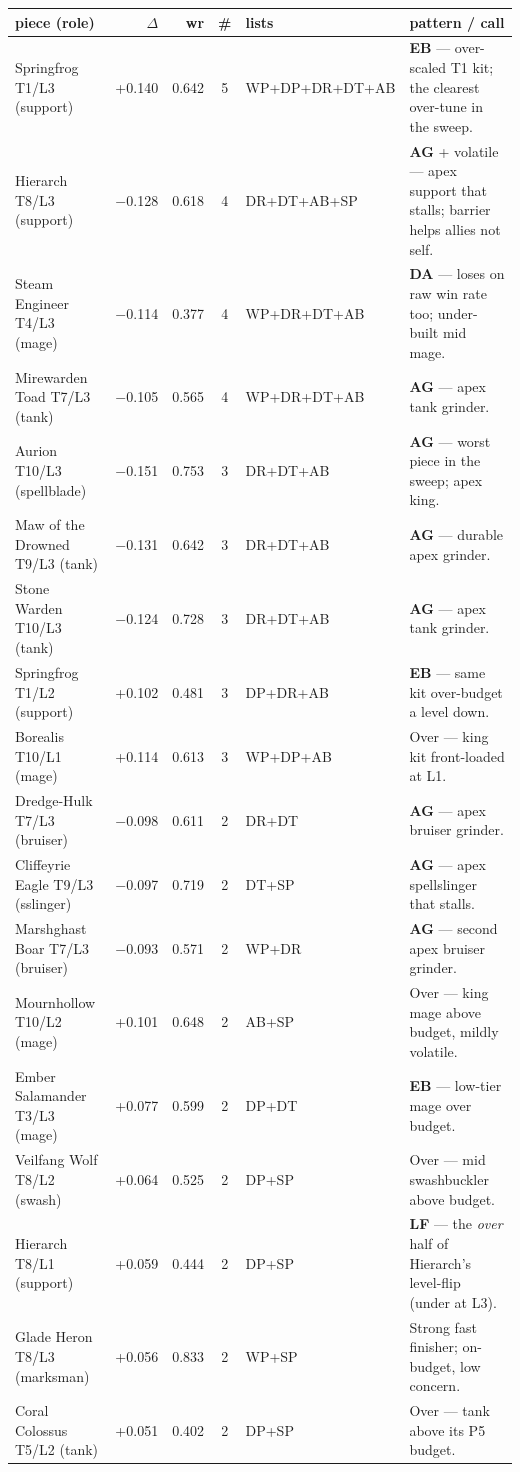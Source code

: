 \documentclass[10pt]{article}
\begin{document}
{\small
\begin{tabularx}{\linewidth}{lrrclL}
\toprule
\textbf{piece (role)} & \textbf{$\Delta$} & \textbf{wr} & \textbf{\#} & \textbf{lists} & \textbf{pattern / call} \\
\midrule
Springfrog T1/L3 (support) & +0.140 & 0.642 & 5 & WP+DP+DR+DT+AB & \textbf{EB} --- over-scaled T1 kit; the clearest over-tune in the sweep. \\
Hierarch T8/L3 (support) & $-$0.128 & 0.618 & 4 & DR+DT+AB+SP & \textbf{AG} + volatile --- apex support that stalls; barrier helps allies not self. \\
Steam Engineer T4/L3 (mage) & $-$0.114 & 0.377 & 4 & WP+DR+DT+AB & \textbf{DA} --- loses on raw win rate too; under-built mid mage. \\
Mirewarden Toad T7/L3 (tank) & $-$0.105 & 0.565 & 4 & WP+DR+DT+AB & \textbf{AG} --- apex tank grinder. \\
Aurion T10/L3 (spellblade) & $-$0.151 & 0.753 & 3 & DR+DT+AB & \textbf{AG} --- worst piece in the sweep; apex king. \\
Maw of the Drowned T9/L3 (tank) & $-$0.131 & 0.642 & 3 & DR+DT+AB & \textbf{AG} --- durable apex grinder. \\
Stone Warden T10/L3 (tank) & $-$0.124 & 0.728 & 3 & DR+DT+AB & \textbf{AG} --- apex tank grinder. \\
Springfrog T1/L2 (support) & +0.102 & 0.481 & 3 & DP+DR+AB & \textbf{EB} --- same kit over-budget a level down. \\
Borealis T10/L1 (mage) & +0.114 & 0.613 & 3 & WP+DP+AB & Over --- king kit front-loaded at L1. \\
Dredge-Hulk T7/L3 (bruiser) & $-$0.098 & 0.611 & 2 & DR+DT & \textbf{AG} --- apex bruiser grinder. \\
Cliffeyrie Eagle T9/L3 (sslinger) & $-$0.097 & 0.719 & 2 & DT+SP & \textbf{AG} --- apex spellslinger that stalls. \\
Marshghast Boar T7/L3 (bruiser) & $-$0.093 & 0.571 & 2 & WP+DR & \textbf{AG} --- second apex bruiser grinder. \\
Mournhollow T10/L2 (mage) & +0.101 & 0.648 & 2 & AB+SP & Over --- king mage above budget, mildly volatile. \\
Ember Salamander T3/L3 (mage) & +0.077 & 0.599 & 2 & DP+DT & \textbf{EB} --- low-tier mage over budget. \\
Veilfang Wolf T8/L2 (swash) & +0.064 & 0.525 & 2 & DP+SP & Over --- mid swashbuckler above budget. \\
Hierarch T8/L1 (support) & +0.059 & 0.444 & 2 & DP+SP & \textbf{LF} --- the \emph{over} half of Hierarch's level-flip (under at L3). \\
Glade Heron T8/L3 (marksman) & +0.056 & 0.833 & 2 & WP+SP & Strong fast finisher; on-budget, low concern. \\
Coral Colossus T5/L2 (tank) & +0.051 & 0.402 & 2 & DP+SP & Over --- tank above its P5 budget. \\
\bottomrule
\end{tabularx}
}
\medskip
\end{document}
